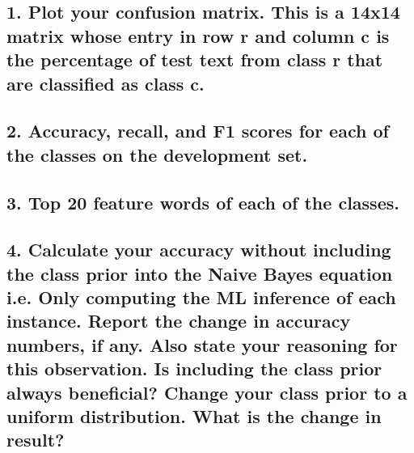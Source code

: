 \subsection*{1. Plot your confusion matrix. This is a 14x14 matrix whose entry in row r and column c is the percentage of test text from class r that are classified as class c.}




\subsection*{2. Accuracy, recall, and F1 scores for each of the classes on the development set.}



\subsection*{3. Top 20 feature words of each of the classes.}



\subsection*{4. Calculate your accuracy without including the class prior into the Naive Bayes equation i.e. Only computing the ML inference of each instance. Report the change in accuracy numbers, if any. Also state your reasoning for this observation. Is including the class prior always beneficial? Change your class prior to a uniform distribution. What is the change in result?}


